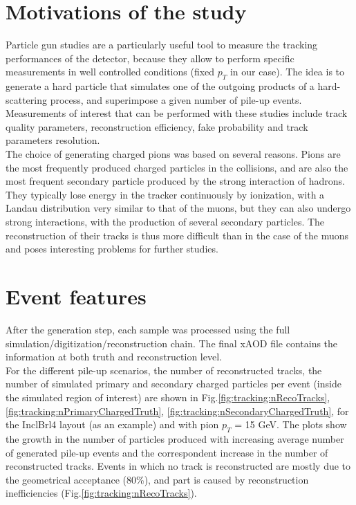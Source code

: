 \documentclass[a4paper,twoside,12pt]{book}
\begin{document}
\section{Motivations of the study}
Particle gun studies are a particularly useful tool to measure the tracking performances of the detector, because they allow to perform
specific measurements in well controlled conditions (fixed $p_{T}$ in our case). The idea is to generate a hard particle that
simulates one of the outgoing products of a hard-scattering process, and superimpose a given number of pile-up events. Measurements of interest that can be performed 
with these studies include track quality parameters, reconstruction efficiency, fake probability and track parameters resolution.\\

The choice of generating charged pions was based on several reasons. Pions are the most frequently
produced charged particles in the collisions, and are also the most frequent secondary particle produced by the strong interaction of hadrons. They typically lose energy in the tracker continuously by ionization, with a Landau distribution very similar to that of the muons, but they can also undergo strong interactions, with the production of several secondary particles. The reconstruction of their tracks
is thus more difficult than in the case of the muons and poses interesting problems for further studies.

\section{Event features}\label{subsec:tracking:eventFeatures}
After the generation step, each sample was processed using the full simulation/digitization/reconstruction chain. The final xAOD file contains the information at both
truth and reconstruction level. \\

For the different pile-up scenarios, the number of reconstructed tracks, the number of simulated primary and secondary charged particles per event
(inside the simulated region of interest) are shown in Fig.\ref{fig:tracking:nRecoTracks}, \ref{fig:tracking:nPrimaryChargedTruth}, \ref{fig:tracking:nSecondaryChargedTruth},  for the InclBrl4 layout (as an example) and with pion $p_{T}$ = 15 GeV. The plots show the growth in the number of particles produced with increasing average number of generated pile-up events and
the correspondent increase in the number of reconstructed tracks. Events in which no track is reconstructed are mostly due to the geometrical acceptance (80\%), and part is caused by reconstruction inefficiencies (Fig.\ref{fig:tracking:nRecoTracks}).\\
\end{document}
